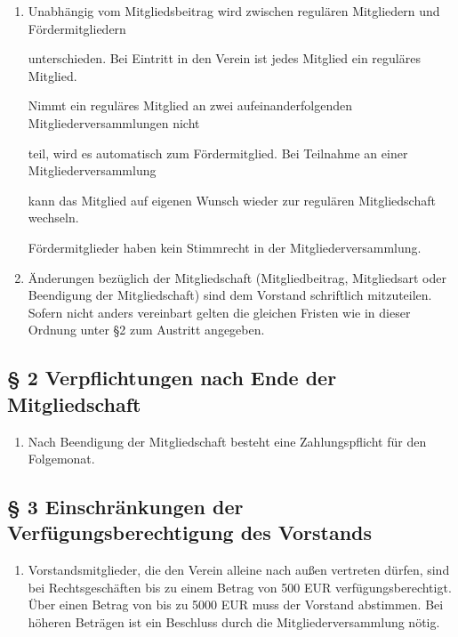 \documentclass[10pt,a4paper]{article}
\begin{document}
\begin{enumerate}
    \item Unabhängig vom Mitgliedsbeitrag wird zwischen regulären Mitgliedern und Fördermitgliedern

    unterschieden. Bei Eintritt in den Verein ist jedes Mitglied ein reguläres Mitglied.

    Nimmt ein reguläres Mitglied an zwei aufeinanderfolgenden Mitgliederversammlungen nicht

    teil, wird es automatisch zum Fördermitglied. Bei Teilnahme an einer Mitgliederversammlung

    kann das Mitglied auf eigenen Wunsch wieder zur regulären Mitgliedschaft wechseln.

    Fördermitglieder haben kein Stimmrecht in der Mitgliederversammlung.

    
\item Änderungen bezüglich der Mitgliedschaft (Mitgliedbeitrag, Mitgliedsart oder Beendigung der Mitgliedschaft)
    sind dem Vorstand schriftlich mitzuteilen. Sofern nicht anders
    vereinbart gelten die gleichen Fristen wie in dieser Ordnung unter §2
    zum Austritt angegeben.
\end{enumerate}
%
%
\subsection*{§ 2 Verpflichtungen nach Ende der Mitgliedschaft}
\begin{enumerate}
\item Nach Beendigung der Mitgliedschaft besteht eine Zahlungspflicht für den Folgemonat.
\end{enumerate}
%
%
\subsection*{§ 3 Einschränkungen der Verfügungsberechtigung des Vorstands}
\begin{enumerate}
\item Vorstandsmitglieder, die den Verein alleine nach außen vertreten
    dürfen, sind bei Rechtsgeschäften bis zu einem Betrag von 500 EUR
    verfügungsberechtigt. Über einen Betrag von bis zu 5000 EUR muss der
    Vorstand abstimmen. Bei höheren Beträgen ist ein Beschluss durch die
    Mitgliederversammlung nötig.
\end{enumerate}
%
%
\end{document}
